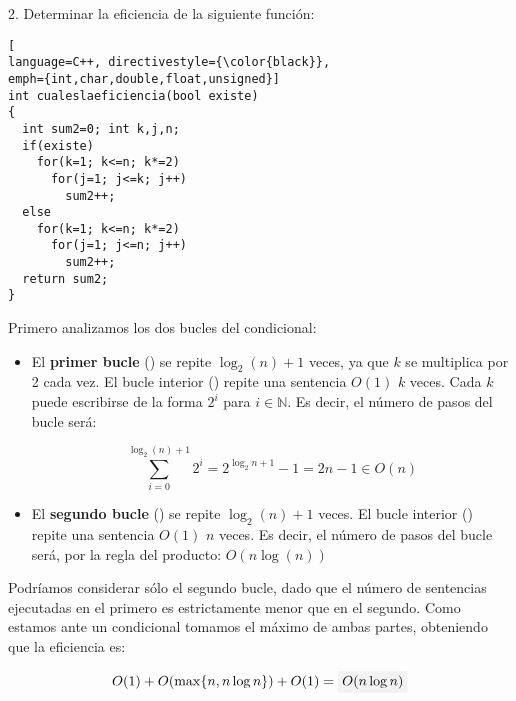 \begin{ejercicio}
{2. Determinar la eficiencia de la siguiente función:}
\begin{lstlisting}[
language=C++, directivestyle={\color{black}},
emph={int,char,double,float,unsigned}]
int cualeslaeficiencia(bool existe)
{
  int sum2=0; int k,j,n;
  if(existe)
    for(k=1; k<=n; k*=2)
      for(j=1; j<=k; j++)
        sum2++;
  else
    for(k=1; k<=n; k*=2)
      for(j=1; j<=n; j++)
        sum2++;
  return sum2;
}
\end{lstlisting}
\vspace*{5mm}

Primero analizamos los dos bucles del condicional:

\begin{itemize}

\item El \textbf{primer bucle} () se repite $\log_2(n) + 1$ veces,
ya que $k$ se  multiplica por 2 cada vez.
El bucle interior () repite una sentencia $O(1)$ $k$ veces.
Cada $k$ puede escribirse de la forma $2^i$ para $i \in \mathbb{N}$.
Es decir, el número de pasos del bucle será:

\[\sum_{i=0}^{\log_2(n)+1} 2^i = 2^{\log_2{n}+1} -1 = 2n -1 \in O(n)\]

\item El \textbf{segundo bucle} () se repite $\log_2(n) +1$ veces.
El bucle interior () repite una sentencia $O(1)$ $n$ veces.
Es decir, el número de pasos del bucle será, por la regla del producto:
$O(n\log(n))$
\end{itemize}

Podríamos considerar sólo el segundo bucle, dado que el número
de sentencias ejecutadas en el primero es estrictamente menor
que en el segundo.
Como estamos ante un condicional tomamos el máximo de ambas
partes, obteniendo que la eficiencia es:

\[O(1) + O(\max\{n,n\log n\}) + O(1)  = \resultado{O(n\log n)}\]

\end{ejercicio}
